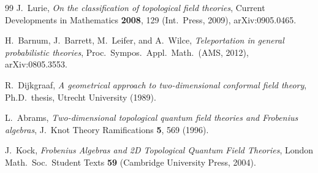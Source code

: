 \documentclass[prl,aps,10pt,superscriptaddress, floatfix]{revtex4-2}
\begin{document}
\begin{thebibliography}{99}
J.~Lurie,
\emph{On the classification of topological field theories},
Current Developments in Mathematics \textbf{2008}, 129 (Int.\ Press, 2009),
arXiv:0905.0465.

H.~Barnum, J.~Barrett, M.~Leifer, and A.~Wilce,
\emph{Teleportation in general probabilistic theories},
Proc.\ Sympos.\ Appl.\ Math.\ (AMS, 2012),
arXiv:0805.3553.

R.~Dijkgraaf,
\emph{A geometrical approach to two-dimensional conformal field theory},
Ph.D.\ thesis, Utrecht University (1989).

L.~Abrams,
\emph{Two-dimensional topological quantum field theories and Frobenius algebras},
J.\ Knot Theory Ramifications \textbf{5}, 569 (1996).

J.~Kock,
\emph{Frobenius Algebras and 2D Topological Quantum Field Theories},
London Math.\ Soc.\ Student Texts \textbf{59}
(Cambridge University Press, 2004).

\end{thebibliography}
\end{document}
